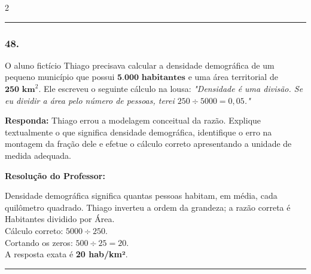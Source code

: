 \begin{multicols*}{2}
\par\vspace{\espacoQuestao}

\noindent\textcolor{CorLinha}{\rule{\linewidth}{0.5pt}} 
\par\vspace{\espacoPreQuestao}
\subsubsection*{48.} O aluno fictício Thiago precisava calcular a densidade demográfica de um pequeno município que possui $ \textbf{5.000 habitantes} $ e uma área territorial de $ \textbf{250 km}^{2} $. Ele escreveu o seguinte cálculo na lousa:
\textit{"Densidade é uma divisão. Se eu dividir a área pelo número de pessoas, terei $ 250 \div 5000 = 0,05 $."}
\begin{boxresponda}
\textbf{Responda:} Thiago errou a modelagem conceitual da razão. Explique textualmente o que significa densidade demográfica, identifique o erro na montagem da fração dele e efetue o cálculo correto apresentando a unidade de medida adequada.
\end{boxresponda}

\ifgabarito
    \begin{tcolorbox}[colback=CorTitUm!5, colframe=CorTitUm, boxrule=1pt, arc=4pt, left=6pt, right=6pt, top=6pt, bottom=6pt]
    \small\textbf{\textcolor{CorTitUm}{Resolução do Professor:}}\par\vspace{0.1cm}
    \color{CinzaEscuro}
    Densidade demográfica significa quantas pessoas habitam, em média, cada quilômetro quadrado. Thiago inverteu a ordem da grandeza; a razão correta é Habitantes dividido por Área.\\
    Cálculo correto: $ 5000 \div 250 $.\\
    Cortando os zeros: $ 500 \div 25 = 20 $.\\
    A resposta exata é \textbf{20 hab/km²}.
    \end{tcolorbox}
\fi

\par\vspace{\espacoQuestao}

\noindent\textcolor{CorLinha}{\rule{\linewidth}{0.5pt}} 
\par\vspace{\espacoPreQuestao}

\end{multicols*}
